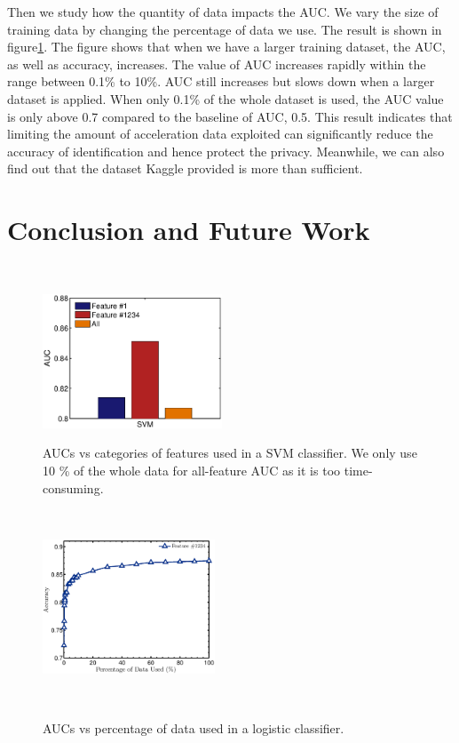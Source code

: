 \documentclass{article} %
\begin{document}
Then we study how the quantity of data impacts the AUC. We vary the size of training data by changing the percentage of data we use. The result is shown in figure\ref{fig:percentage}. The figure shows that when we have a larger training dataset, the AUC, as well as accuracy, increases. The value of AUC increases rapidly within the range between 0.1\% to 10\%. AUC still increases but slows down when a larger dataset is applied. When only 0.1\% of the whole dataset is used, the AUC value is only above 0.7 compared to the baseline of AUC, 0.5. This result indicates that limiting the amount of acceleration data exploited can significantly reduce the accuracy of identification and hence protect the privacy. Meanwhile, we can also find out that the dataset Kaggle provided is more than sufficient.


\section{Conclusion and Future Work}


\begin{figure}
    \hspace{-0.5cm}
    \begin{minipage}[t]{0.02\textwidth}~
    \end{minipage}
    \begin{minipage}[t]{0.47\textwidth}
    \centering
    \includegraphics[height=40mm]{fig/feature_svm.eps}
    \caption{AUCs vs categories of features used in a SVM classifier. We only use 10 \% of the whole data for all-feature AUC as it is too time-consuming.}
    \label{fig:feature_svm}
    \end{minipage}
    \begin{minipage}[t]{0.02\textwidth}~
    \end{minipage}
    \begin{minipage}[t]{0.47\textwidth}
    \centering
    \includegraphics[height=40mm]{fig/percentage.eps}\\
    \caption{AUCs vs percentage of data used in a logistic classifier. }
    \label{fig:percentage}
    \end{minipage}
    \begin{minipage}[t]{0.02\textwidth}~
    \end{minipage}%
 \end{figure}
\end{document}
